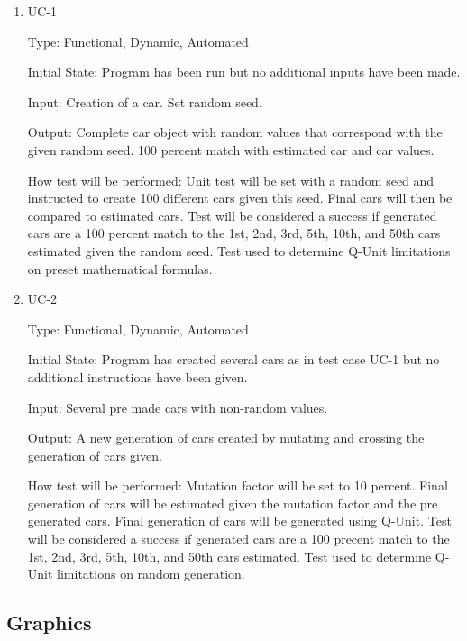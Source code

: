 \documentclass[12pt, titlepage]{article}
\begin{document}
\begin{enumerate}

\item{UC-1\\}

Type: Functional, Dynamic, Automated
					
Initial State: Program has been run but no additional inputs have been made.
					
Input: Creation of a car. Set random seed.
					
Output: Complete car object with random values that correspond with the given random seed. 100 percent match with estimated car and car values.
					
How test will be performed: Unit test will be set with a random seed and instructed to create 100 different cars given this seed. Final cars will then be compared to estimated cars. Test will be considered a success if generated cars are a 100 percent match to the 1st, 2nd, 3rd, 5th, 10th, and 50th cars estimated given the random seed. Test used to determine Q-Unit limitations on preset mathematical formulas.
					
\item{UC-2\\}

Type: Functional, Dynamic, Automated
					
Initial State: Program has created several cars as in test case UC-1 but no additional instructions have been given.
					
Input: Several pre made cars with non-random values.
					
Output: A new generation of cars created by mutating and crossing the generation of cars given.
					
How test will be performed: Mutation factor will be set to 10 percent. Final generation of cars will be estimated given the mutation factor and the pre generated cars. Final generation of cars will be generated using Q-Unit. Test will be considered a success if generated cars are a 100 precent match to the 1st, 2nd, 3rd, 5th, 10th, and 50th cars estimated. Test used to determine Q-Unit limitations on random generation.

\end{enumerate}

\subsection{Graphics}
\end{document}
